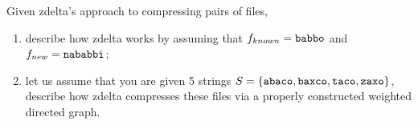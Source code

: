 \exercise

Given zdelta’s approach to compressing pairs of files,

\begin{enumerate}

  \item describe how zdelta works by assuming that $f_{known} = \text{\tt
  babbo}$ and $f_{new} = \text{\tt nababbi}$;

  \item let us assume that you are given 5 strings $S = \{ \text{\tt abaco},
  \text{\tt baxco}, \text{\tt taco}, \text{\tt zaxo} \}$, describe how zdelta
  compresses these files via a properly constructed weighted directed graph.

\end{enumerate}

\solution

